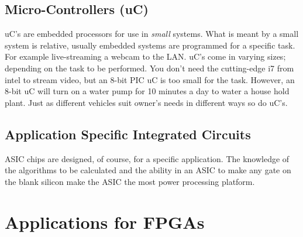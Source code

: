 \subsection{Micro-Controllers (uC)}
\ac{uC}'s are embedded processors for use in \emph{small} systems. What is meant by a small system is relative, usually embedded systems are programmed for a specific task. For example live-streaming a webcam to the \ac{LAN}. \ac{uC}'s come in varying sizes; depending on the task to be performed. You don't need the cutting-edge i7 from intel to stream video, but an 8-bit \ac{PIC} \ac{uC} is too small for the task. However, an 8-bit \ac{uC} will turn on a water pump for 10 minutes a day to water a house hold plant. Just as different vehicles suit owner's needs in different ways so do \ac{uC}'s.


\subsection{Application Specific Integrated Circuits}
\ac{ASIC} chips are designed, of course, for a specific application. The knowledge of the algorithms to be calculated and the ability in an \ac{ASIC} to make any gate on the blank silicon make the \ac{ASIC} the most power processing platform. 
 

\section{Applications for FPGAs}

